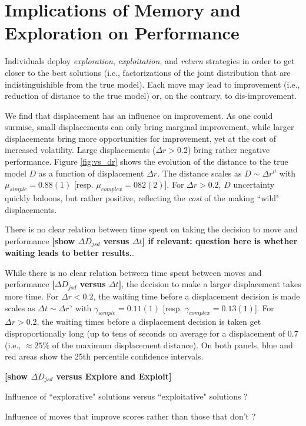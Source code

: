 \section{Implications of Memory and Exploration on Performance}
Individuals deploy {\it exploration}, {\it exploitation}, and {\it return} strategies in order to get closer to the best solutions (i.e., factorizations of the joint distribution that are indistinguishible from the true model). Each move may lead to improvement (i.e., reduction of distance to the true model) or, on the contrary, to dis-improvement. 

We find that displacement has an influence on improvement. As one could surmise, small displacements can only bring marginal improvement, while larger displacements bring more opportunities for improvement, yet at the cost of increased volatility. Large displacements ($\Delta r > 0.2$) bring rather negative performance. Figure \ref{fig:vs_dr} shows the evolution of the distance to the true model $D$ as a function of displacement $\Delta r$. The distance scales as $D \sim {\Delta r}^{\mu}$ with $\mu_{simple} = 0.88(1)$ [resp. $\mu_{complex} = 082(2)$]. For $\Delta r > 0.2$, $D$ uncertainty quickly baloons, but rather positive, reflecting the {\it cost} of the making ``wild" displacements. 

There is no clear relation between time spent on taking the decision to move and performance {\bf [show $\Delta D_{jsd}$ versus $\Delta t$] if relevant: question here is whether waiting leads to better results.}.

While there is no clear relation between time spent between moves and performance {\bf [$\Delta D_{jsd}$ versus $\Delta t$]}, the decision to make a larger displacement takes more time. For $\Delta r < 0.2$, the waiting time before a displacement decision is made scales as $\Delta t \sim \Delta r^{\gamma}$ with $\gamma_{simple} = 0.11(1)$ [resp. $\gamma_{complex} = 0.13(1)$]. For $\Delta r > 0.2$, the waiting times before a displacement decision is taken get disproportionally long (up to tens of seconds on average for a displacement of 0.7 (i.e., $\approx 25\%$ of the maximum displacement distance). On both panels, blue and red areas show the 25th percentile confidence intervals.


{\bf [show $\Delta D_{jsd}$ versus Explore and Exploit]}

Influence of ``explorative" solutions versus ``exploitative" solutions ?

Influence of moves that improve scores rather than those that don't ?

